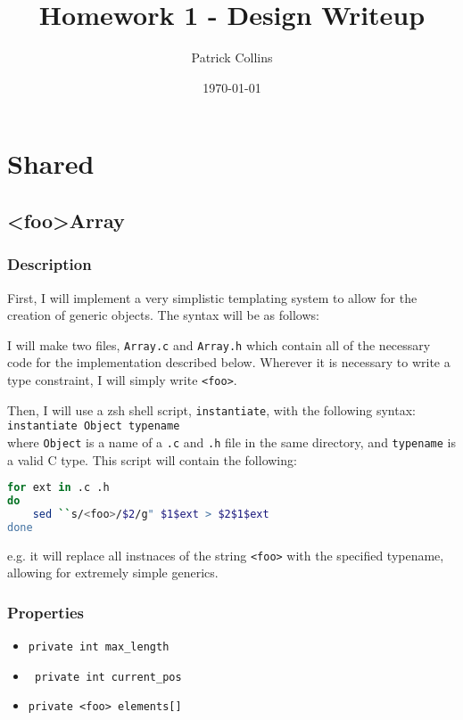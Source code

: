 \documentclass{article}
\newcommand{\field}[1]{\item \texttt{ #1 }}
\begin{document}
\title{Homework 1 - Design Writeup}
\author{Patrick Collins}
\date{\today}
\maketitle

\section{Shared} 

\subsection{<foo>Array}
\subsubsection{Description}
First, I will implement a very simplistic templating system to allow
for the creation of generic objects. The syntax will be as follows:

I will make two files, \texttt{Array.c} and \texttt{Array.h}
which contain all of the necessary code for the implementation
described below. Wherever it is necessary to write a type constraint,
I will simply write \texttt{<foo>}. 

Then, I will use a zsh shell script, \texttt{instantiate}, with the
following syntax:\\
\texttt{instantiate Object typename}\\
where \texttt{Object} is a name of a \texttt{.c} and \texttt{.h}
file in the same directory, and \texttt{typename} is a valid C
type. This script will contain the following:
\begin{lstlisting}[language=bash]
for ext in .c .h
do
    sed ``s/<foo>/$2/g" $1$ext > $2$1$ext
done
\end{lstlisting}

e.g. it will replace all instnaces of the string \texttt{<foo>} with
the specified typename, allowing for extremely simple generics.

\subsubsection{Properties}
\begin{itemize}
\item \texttt{private int max_length}
\field{private int current_pos}
\item \texttt{private <foo> elements[]}
\end{itemize}
\end{document}
